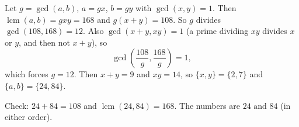 Let $g=\gcd(a,b)$, $a=gx$, $b=gy$ with $\gcd(x,y)=1$. Then $\operatorname{lcm}(a,b)=gxy=168$ and $g(x+y)=108$. So $g$ divides $\gcd(108,168)=12$. Also $\gcd(x+y,xy)=1$ (a prime dividing $xy$ divides $x$ or $y$, and then not $x+y$), so
\[
\gcd\left(\dfrac{108}{g},\dfrac{168}{g}\right)=1,
\]
which forces $g=12$. Then $x+y=9$ and $xy=14$, so $\{x,y\}=\{2,7\}$ and $\{a,b\}=\{24,84\}$.

Check: $24+84=108$ and $\operatorname{lcm}(24,84)=168$. The numbers are $\boxed{24\text{ and }84}$ (in either order).
